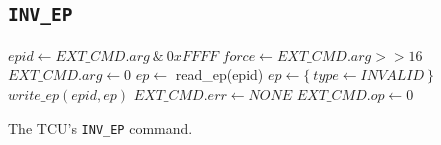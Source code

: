 \subsection{\texttt{INV\_EP}}

\begin{algorithm}[H]
    $epid \gets EXT\_CMD.arg\ \&\ 0xFFFF$\;
    $force \gets EXT\_CMD.arg >> 16$\;
    \BlankLine
    $EXT\_CMD.arg \gets 0$\;
    \BlankLine
    $ep \gets$ read\_ep(epid)\;
    \BlankLine
    $ep \gets \{~type \gets INVALID~\}$\;
    $write\_ep(epid, ep)$\;
    \BlankLine
    $EXT\_CMD.err \gets NONE$\;
    $EXT\_CMD.op \gets 0$\;
    \caption{The TCU's \texttt{INV\_EP} command.}
\end{algorithm}
